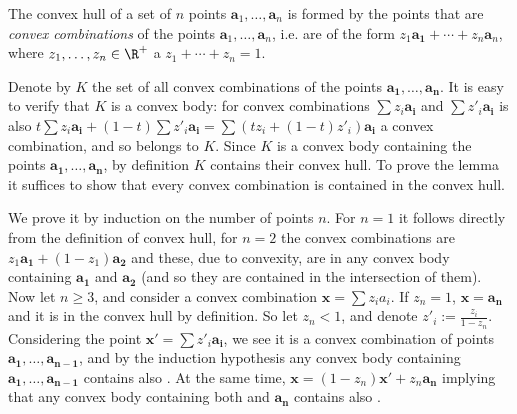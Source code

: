\begin{shaded}
\begin{lema}
  \label{lm:KO:1}
  The convex hull of a set of $n$ points 
$\bm{a}_1,\ldots,\bm{a}_n$ 
is formed by the points that are {\em convex combinations} of the points $\bm{a}_1,\ldots,\bm{a}_n$, i.e.
are of the form  $z_1\bm{a_1}+\cdots+z_n\bm{a}_n$,
where
 \hbox{$z_1,\ldots,z_n\in\R^+$} a $z_1+\cdots+z_n=1$.  
\end{lema}


\begin{dokaz}
  Denote by $K$ the set of all convex combinations of the points $\bm{a_1},\ldots,\bm{a_n}$.
  It is easy to verify that $K$ is a convex body: for convex combinations  $\sum z_i\bm{a_i}$
  and  $\sum z'_i\bm{a_i}$ is also $t\sum z_i\bm{a_i} + (1-t)\sum z'_i\bm{a_i} = \sum (tz_i+(1-t)z'_i)\bm{a_i}$
  a convex combination, and so belongs to $K$. Since $K$ is a convex body containing the points
  $\bm{a_1},\ldots,\bm{a_n}$,
  by definition $K$ contains their convex hull. To prove the lemma it suffices to show that every convex combination 
  is contained in the convex hull.

  \noindent
  We prove it by induction on the number of points $n$. For $n=1$ it follows directly from the definition of 
  convex hull, for $n=2$ the convex combinations are  $z_1\bm{a_1}+(1-z_1)\bm{a_2}$ and these, due to convexity,
  are in any convex body containing $\bm{a_1}$ and  $\bm{a_2}$ (and so they are contained in the intersection
  of them). Now let $n\ge 3$, and consider a convex combination  $\bm{x}=\sum z_ia_i$. If $z_n=1$, $\bm{x}=\bm{a_n}$
  and  it is in the convex hull by definition. So let $z_n<1$, and denote  $z'_i:=\frac{z_i}{1-z_n}$.
  Considering the point $\bm{x'}=\sum z'_i\bm{a_i}$, we see it is a convex combination of points 
  $\bm{a_1},\ldots,\bm{a_{n-1}}$, and by the induction hypothesis any convex body containing 
  $\bm{a_1},\ldots,\bm{a_{n-1}}$ contains also . At the same time,  $\bm{x}=(1-z_n)\bm{x'}+z_n\bm{a_n}$
  implying that any convex body containing both  and $\bm{a_n}$ contains also .
\end{dokaz}

\noindent
\begin{minipage}[t]{6cm}
  \vspace{0pt}
\begin{center}
\end{center}
\end{minipage}
\end{shaded}
